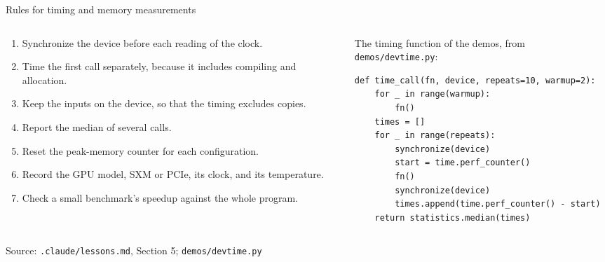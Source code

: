 \documentclass[aspectratio=169,10pt]{beamer}
\newcommand{\source}[1]{\par\vfill{\scriptsize\textcolor{inkGray}{Source: #1}\par}}
\begin{document}
\begin{frame}[fragile]{Rules for timing and memory measurements}
  \begin{columns}[T]
    \begin{column}{0.50\textwidth}
      {\small
      \begin{enumerate}
        \item Synchronize the device before each reading of the clock.
        \item Time the first call separately, because it includes compiling
          and allocation.
        \item Keep the inputs on the device, so that the timing excludes
          copies.
        \item Report the median of several calls.
        \item Reset the peak-memory counter for each configuration.
        \item Record the GPU model, SXM or PCIe, its clock, and its
          temperature.
        \item Check a small benchmark's speedup against the whole program.
      \end{enumerate}}
    \end{column}
    \begin{column}{0.48\textwidth}
      {\small The timing function of the demos, from \texttt{demos/devtime.py}:}
      \begin{lstlisting}
def time_call(fn, device, repeats=10, warmup=2):
    for _ in range(warmup):
        fn()
    times = []
    for _ in range(repeats):
        synchronize(device)
        start = time.perf_counter()
        fn()
        synchronize(device)
        times.append(time.perf_counter() - start)
    return statistics.median(times)
      \end{lstlisting}
    \end{column}
  \end{columns}
  \source{\texttt{.claude/lessons.md}, Section 5; \texttt{demos/devtime.py}}
\end{frame}
\end{document}
